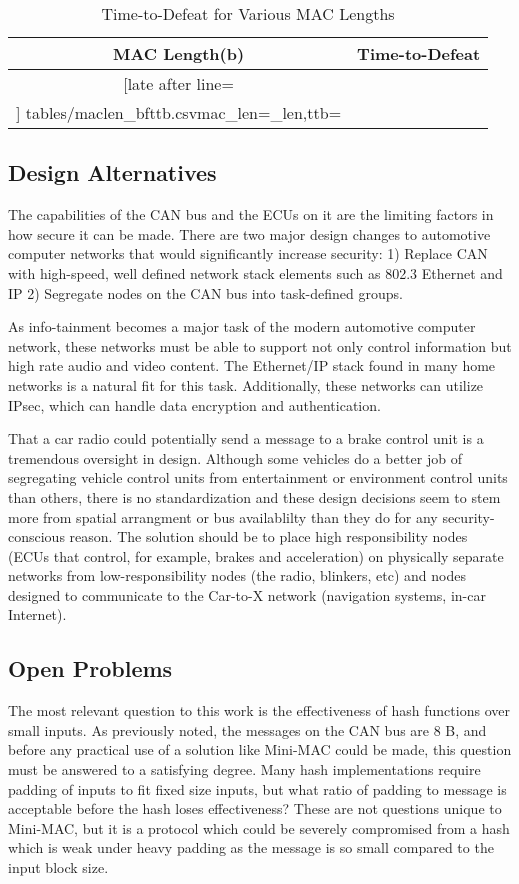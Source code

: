 	\begin{table}	
	\centering
	\caption{Time-to-Defeat for Various MAC Lengths}
	\vspace{8pt}
	\begin{tabular}{|c|r|}\hline%
	\bfseries MAC Length(b) & \bfseries Time-to-Defeat\\\hline \csvreader[late after line=\\]%
		{tables/maclen_bfttb.csv}{mac_len=\mac_len,ttb=\ttb}%
		{\mac_len & \ttb}%
		\hline
	\end{tabular}
	\end{table}

\subsection{Design Alternatives}
The capabilities of the CAN bus and the ECUs on it are the limiting factors in how secure it can be made. There are two major design changes to automotive computer networks that would significantly increase security: 1) Replace CAN with high-speed, well defined network stack elements such as 802.3 Ethernet and IP 2) Segregate nodes on the CAN bus into task-defined groups.

As info-tainment becomes a major task of the modern automotive computer network, these networks must be able to support not only control information but high rate audio and video content. The Ethernet/IP stack found in many home networks is a natural fit for this task. Additionally, these networks can utilize IPsec, which can handle data encryption and authentication.

That a car radio could potentially send a message to a brake control unit is a tremendous oversight in design. Although some vehicles do a better job of segregating vehicle control units from entertainment or environment control units than others, there is no standardization and these design decisions seem to stem more from spatial arrangment or bus availablilty than they do for any security-conscious reason. The solution should be to place high responsibility nodes (ECUs that control, for example, brakes and acceleration) on physically separate networks from low-responsibility nodes (the radio, blinkers, etc) and nodes designed to communicate to the Car-to-X network (navigation systems, in-car Internet).


\subsection{Open Problems}
The most relevant question to this work is the effectiveness of hash functions over small inputs. As previously noted, the messages on the CAN bus are 8 B, and before any practical use of a solution like Mini-MAC could be made, this question must be answered to a satisfying degree. Many hash implementations require padding of inputs to fit fixed size inputs, but what ratio of padding to message is acceptable before the hash loses effectiveness? These are not questions unique to Mini-MAC, but it is a protocol which could be severely compromised from a hash which is weak under heavy padding as the message is so small compared to the input block size.

